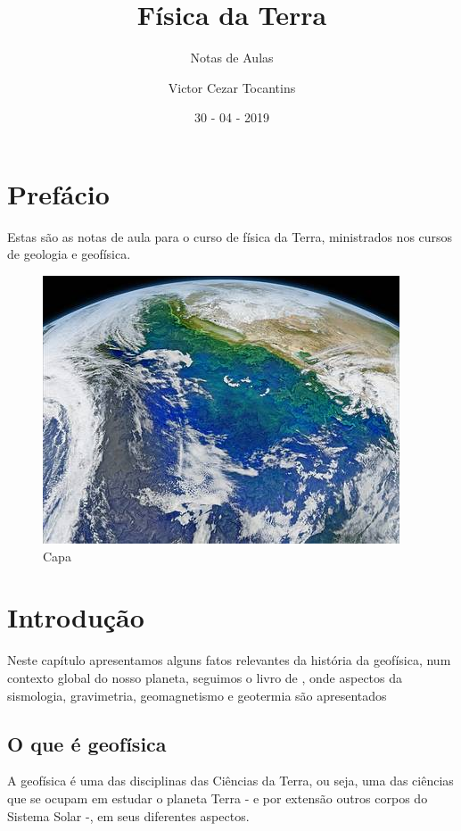 \documentclass[]{book}
\title{Física da Terra}
\subtitle{Notas de Aulas}
\author{Victor Cezar Tocantins}
\date{30 - 04 - 2019}
\theoremstyle{definition}
\theoremstyle{definition}
\theoremstyle{definition}
\theoremstyle{remark}
\begin{document}
\maketitle

{
\hypersetup{linkcolor=black}
\setcounter{tocdepth}{1}
\tableofcontents
}
\hypertarget{prefacio}{%
\chapter*{Prefácio}\label{prefacio}}

Estas são as notas de aula para o curso de física da Terra, ministrados nos cursos de geologia e geofísica.

\begin{figure}
\centering
\includegraphics{images/cover.jpg}
\caption{Capa}
\end{figure}

\hypertarget{cap01}{%
\chapter{Introdução}\label{cap01}}

Neste capítulo apresentamos alguns fatos relevantes da história da geofísica, num contexto global do nosso planeta, seguimos o livro de \citet{Ribeiro2018}, onde aspectos da sismologia, gravimetria, geomagnetismo e geotermia são apresentados

\hypertarget{o-que-e-geofisica}{%
\section{O que é geofísica}\label{o-que-e-geofisica}}

A geofísica é uma das disciplinas das Ciências da Terra, ou seja, uma das ciências que se ocupam em estudar o planeta Terra - e por extensão outros corpos do Sistema Solar -, em seus diferentes aspectos.
\end{document}
